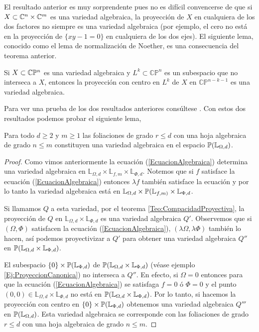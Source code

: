 El resultado anterior es muy sorprendente pues no es difícil convencerse de que si $X\subset\mathbb{C}^{n}\times\mathbb{C}^{m}$ es una variedad algebraica, la proyección de $X$ en cualquiera de los dos factores no siempre es una variedad algebraica (por ejemplo, el cero no está en la proyección de $\{xy-1=0\}$ en cualquiera de los dos ejes). El siguiente lema, conocido como el lema de normalización de Noether, es una consecuencia del teorema anterior.

\begin{Lema}
\label{Lema:NormalizacionDeNoether}
Si $X\subset\mathbb{C}\mathbb{P}^{n}$ es una variedad algebraica y $L^{k}\subset\mathbb{CP}^{n  }$ es un subespacio que no interseca a $X$, entonces la proyección con centro en $L^{k}$ de $X$ en $\mathbb{CP}^{n-k-1}$ es una variedad algebraica. 
\end{Lema}

Para ver una prueba de los dos resultados anteriores consúltese \cite{Mumford}. Con estos dos resultados podemos probar el siguiente lema,

\begin{Lema}
\label{Lema:ConjuntoAlgebraico}
Para todo $d\geq 2$ y $m\geq 1$ las foliaciones de grado $r\leq d$ con una hoja algebraica de grado $n\leq m$ constituyen una variedad algebraica en el espacio $\mathbb{P}(\mathbb{L}_{\Omega,d})$.
\end{Lema}

\begin{proof}
Como vimos anteriormente la ecuación (\ref{EcuacionAlgebraica}) determina una variedad algebraica en $\mathbb{L}_{\Omega,d}\times\mathbb{L}_{f,m}\times\mathbb{L}_{\Phi,d}$. Notemos que si $f$ satisface la ecuación (\ref{EcuacionAlgebraica}) entonces $\lambda f$ también satisface la ecuación y por lo tanto la variedad algebraica está en $\mathbb{L}_{\Omega,d}\times\mathbb{P}(\mathbb{L}_{f,m)}\times\mathbb{L}_{\Phi,d}$.

 Si llamamos $Q$ a esta variedad, por el teorema \ref{Teo:CompacidadProyectiva}, la proyección de $Q$ en $\mathbb{L}_{\Omega,d}\times\mathbb{L}_{\Phi,d}$ es una variedad algebraica $Q'$. Observemos que si $(\Omega,\Phi)$ satisfacen la ecuación (\ref{EcuacionAlgebraica}), $(\lambda\Omega,\lambda\Phi)$ también lo hacen, así podemos proyectivizar a $Q'$ para obtener una variedad algebraica $Q''$ en $\mathbb{P}(\mathbb{L}_{\Omega,d}\times\mathbb{L}_{\Phi,d})$.

El subespacio $\{0\}\times\mathbb{P}(\mathbb{L}_{\Phi,d})$ de $\mathbb{P}(\mathbb{L}_{\Omega,d}\times\mathbb{L}_{\Phi,d})$ (véase ejemplo \ref{Ej:ProyeccionCanonica}) no interseca a $Q''$. En efecto, si $\Omega=0$ entonces para que la ecuación (\ref{EcuacionAlgebraica}) se satisfaga $f=0$ ó $\Phi=0$ y el punto $(0,0)\in\mathbb{L}_{\Omega,d}\times\mathbb{L}_{\Phi,d}$ no está en $\mathbb{P}(\mathbb{L}_{\Omega,d}\times\mathbb{L}_{\Phi,d})$. Por lo tanto, si hacemos la proyección con centro en $\{0\}\times\mathbb{P}(\mathbb{L}_{\Phi,d})$ obtenemos una variedad algebraica $Q'''$ en $\mathbb{P}(\mathbb{L}_{\Omega,d})$. Esta variedad algebraica se corresponde con las foliaciones de grado $r\leq d$ con una hoja algebraica de grado $n\leq m$.  
\end{proof}

